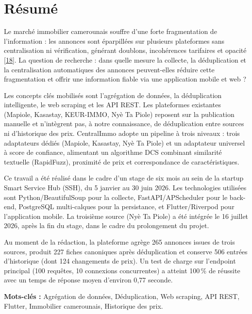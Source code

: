 
\chapter*{Résumé}

Le marché immobilier camerounais souffre d'une forte fragmentation de l'information : les annonces sont éparpillées sur plusieurs plateformes sans centralisation ni vérification, générant doublons, incohérences tarifaires et opacité \hyperref[ref:ins]{[18]}. La question de recherche : dans quelle mesure la collecte, la déduplication et la centralisation automatiques des annonces peuvent-elles réduire cette fragmentation et offrir une information fiable via une application mobile et web ?

Les concepts clés mobilisés sont l'agrégation de données, la déduplication intelligente, le web scraping et les API REST. Les plateformes existantes (Mapiole, Kasastay, KEUR-IMMO, Nyè Ta Piole) reposent sur la publication manuelle et n'intègrent pas, à notre connaissance, de déduplication entre sources ni d'historique des prix. CentralImmo adopte un pipeline à trois niveaux : trois adaptateurs dédiés (Mapiole, Kasastay, Nyè Ta Piole) et un adaptateur universel à score de confiance, alimentant un algorithme DCS combinant similarité textuelle (RapidFuzz), proximité de prix et correspondance de caractéristiques.

Ce travail a été réalisé dans le cadre d'un stage de six mois au sein de la startup Smart Service Hub (SSH), du 5 janvier au 30 juin 2026. Les technologies utilisées sont Python/BeautifulSoup pour la collecte, FastAPI/APScheduler pour le back-end, PostgreSQL multi-calques pour la persistance, et Flutter/Riverpod pour l'application mobile. La troisième source (Nyè Ta Piole) a été intégrée le 16 juillet 2026, après la fin du stage, dans le cadre du prolongement du projet.

Au moment de la rédaction, la plateforme agrège 265 annonces issues de trois sources, produit 227 fiches canoniques après déduplication et conserve 506 entrées d'historique (dont 124 changements de prix). Un test de charge sur l'endpoint principal (100 requêtes, 10 connexions concurrentes) a atteint 100\,\% de réussite avec un temps de réponse moyen d'environ 0{,}77 seconde.

\vspace{0.3cm}
\textbf{Mots-clés :} Agrégation de données, Déduplication, Web scraping, API REST, Flutter, Immobilier camerounais, Historique des prix.